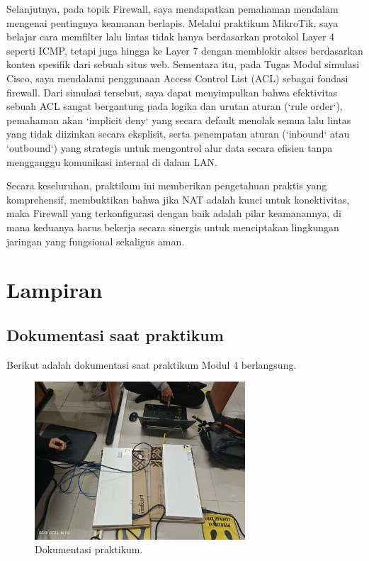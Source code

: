 Selanjutnya, pada topik Firewall, saya mendapatkan pemahaman mendalam mengenai pentingnya keamanan berlapis. Melalui praktikum MikroTik, saya belajar cara memfilter lalu lintas tidak hanya berdasarkan protokol Layer 4 seperti ICMP, tetapi juga hingga ke Layer 7 dengan memblokir akses berdasarkan konten spesifik dari sebuah situs web. Sementara itu, pada Tugas Modul simulasi Cisco, saya mendalami penggunaan Access Control List (ACL) sebagai fondasi firewall. Dari simulasi tersebut, saya dapat menyimpulkan bahwa efektivitas sebuah ACL sangat bergantung pada logika dan urutan aturan (`rule order`), pemahaman akan `implicit deny` yang secara default menolak semua lalu lintas yang tidak diizinkan secara eksplisit, serta penempatan aturan (`inbound` atau `outbound`) yang strategis untuk mengontrol alur data secara efisien tanpa mengganggu komunikasi internal di dalam LAN.

Secara keseluruhan, praktikum ini memberikan pengetahuan praktis yang komprehensif, membuktikan bahwa jika NAT adalah kunci untuk konektivitas, maka Firewall yang terkonfigurasi dengan baik adalah pilar keamanannya, di mana keduanya harus bekerja secara sinergis untuk menciptakan lingkungan jaringan yang fungsional sekaligus aman.
\newpage
\section{Lampiran}
\subsection*{Dokumentasi saat praktikum}
Berikut adalah dokumentasi saat praktikum Modul 4 berlangsung.

\begin{figure}[H]
    \centering
    \includegraphics[width=0.7\textwidth]{img4/lampiran4.jpeg} 
    \caption{Dokumentasi praktikum.}
\end{figure}

